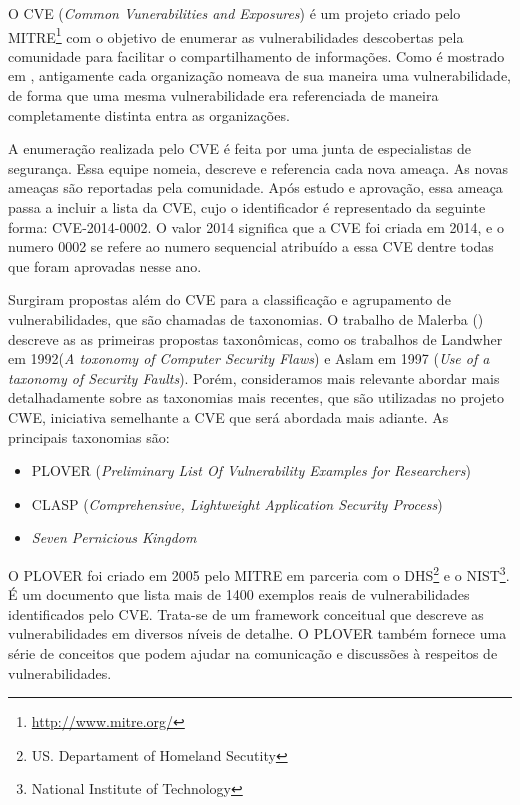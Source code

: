 %

O CVE (\emph{Common Vunerabilities and Exposures}) é um projeto criado pelo MITRE\footnote{\url{http://www.mitre.org/}} com o objetivo de enumerar as vulnerabilidades descobertas pela comunidade para facilitar o compartilhamento de informações. Como é mostrado em \cite{cve2001martin}, antigamente cada organização nomeava de sua maneira uma vulnerabilidade, de forma que uma mesma vulnerabilidade era referenciada de maneira completamente distinta entra as organizações.

%

A enumeração realizada pelo CVE é feita por uma junta de especialistas 	de segurança. Essa equipe nomeia, descreve e referencia cada nova ameaça. As novas ameaças são reportadas pela comunidade. Após estudo e aprovação, essa ameaça passa a incluir a lista da CVE, cujo o identificador é representado da seguinte forma: CVE-2014-0002. O valor 2014 significa que a CVE foi criada em 2014, e o numero 0002 se refere ao numero sequencial atribuído a essa CVE dentre todas que foram aprovadas nesse ano.

%

Surgiram propostas além do CVE para a classificação e agrupamento de vulnerabilidades, que são chamadas de taxonomias. O trabalho de Malerba (\citeyear{malerba2010}) descreve as as primeiras propostas taxonômicas, como os trabalhos de Landwher em 1992(\emph{A toxonomy of Computer Security Flaws}) e Aslam em 1997 (\emph{Use of  a taxonomy of Security Faults}). Porém, consideramos mais relevante abordar mais detalhadamente sobre as taxonomias mais recentes, que são utilizadas no projeto CWE, iniciativa semelhante a CVE que será abordada mais adiante. As principais taxonomias são:

%

\begin{itemize}
\item PLOVER (\emph{Preliminary List Of Vulnerability Examples for Researchers})
\item CLASP (\emph{Comprehensive, Lightweight Application Security Process})
\item \emph{Seven Pernicious Kingdom}
\end{itemize}

%

O PLOVER foi criado em 2005 pelo MITRE em parceria com o DHS\footnote{US. Departament of Homeland Secutity} e o NIST\footnote{National Institute of Technology}. É um documento que lista mais de 1400 exemplos reais de vulnerabilidades identificados pelo CVE. Trata-se de um framework conceitual que descreve as vulnerabilidades em diversos níveis de detalhe. O PLOVER também fornece uma série de conceitos que podem ajudar na comunicação e discussões à respeitos de vulnerabilidades.

